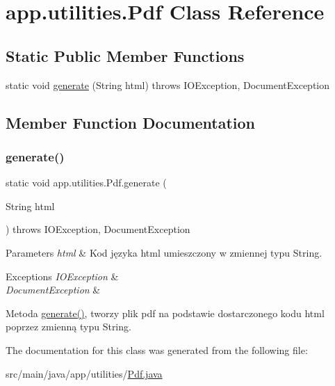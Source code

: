 \hypertarget{classapp_1_1utilities_1_1_pdf}{}\section{app.\+utilities.\+Pdf Class Reference}
\label{classapp_1_1utilities_1_1_pdf}
\subsection*{Static Public Member Functions}
\begin{DoxyCompactItemize}
\item 
static void \mbox{\hyperlink{classapp_1_1utilities_1_1_pdf_a5bc139b9df8c00ec045c7152f5f02071}{generate}} (String html)  throws I\+O\+Exception, Document\+Exception 
\end{DoxyCompactItemize}


\subsection{Member Function Documentation}
\mbox{\label{classapp_1_1utilities_1_1_pdf_a5bc139b9df8c00ec045c7152f5f02071}} 
\subsubsection{\texorpdfstring{generate()}{generate()}}
{\footnotesize\ttfamily static void app.\+utilities.\+Pdf.\+generate (\begin{DoxyParamCaption}\item[{String}]{html }\end{DoxyParamCaption}) throws I\+O\+Exception, Document\+Exception\hspace{0.3cm}{\ttfamily [static]}}


\begin{DoxyParams}{Parameters}
{\em html} & Kod języka html umieszczony w zmiennej typu String. \\
\hline
\end{DoxyParams}

\begin{DoxyExceptions}{Exceptions}
{\em I\+O\+Exception} & \\
\hline
{\em Document\+Exception} & \\
\hline
\end{DoxyExceptions}
Metoda \mbox{\hyperlink{classapp_1_1utilities_1_1_pdf_a5bc139b9df8c00ec045c7152f5f02071}{generate()}}, tworzy plik pdf na podstawie dostarczonego kodu html poprzez zmienną typu String. 

The documentation for this class was generated from the following file\+:\begin{DoxyCompactItemize}
\item 
src/main/java/app/utilities/\mbox{\hyperlink{_pdf_8java}{Pdf.\+java}}\end{DoxyCompactItemize}
